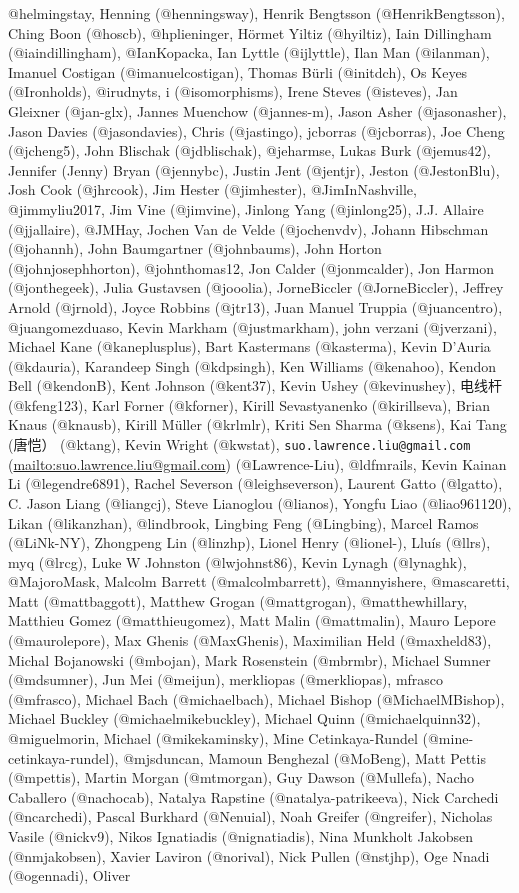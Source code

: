 \documentclass[
]{book}
\renewcommand{\href}[2]{#2 (\url{#1})}
\begin{document}
@helmingstay, Henning (@henningsway), Henrik Bengtsson (@HenrikBengtsson), Ching Boon (@hoscb), @hplieninger, Hörmet Yiltiz (@hyiltiz), Iain Dillingham (@iaindillingham), @IanKopacka, Ian Lyttle (@ijlyttle), Ilan Man (@ilanman), Imanuel Costigan (@imanuelcostigan), Thomas Bürli (@initdch), Os Keyes (@Ironholds), @irudnyts, i (@isomorphisms), Irene Steves (@isteves), Jan Gleixner (@jan-glx), Jannes Muenchow (@jannes-m), Jason Asher (@jasonasher), Jason Davies (@jasondavies), Chris (@jastingo), jcborras (@jcborras), Joe Cheng (@jcheng5), John Blischak (@jdblischak), @jeharmse, Lukas Burk (@jemus42), Jennifer (Jenny) Bryan (@jennybc), Justin Jent (@jentjr), Jeston (@JestonBlu), Josh Cook (@jhrcook), Jim Hester (@jimhester), @JimInNashville, @jimmyliu2017, Jim Vine (@jimvine), Jinlong Yang (@jinlong25), J.J. Allaire (@jjallaire), @JMHay, Jochen Van de Velde (@jochenvdv), Johann Hibschman (@johannh), John Baumgartner (@johnbaums), John Horton (@johnjosephhorton), @johnthomas12, Jon Calder (@jonmcalder), Jon Harmon (@jonthegeek), Julia Gustavsen (@jooolia), JorneBiccler (@JorneBiccler), Jeffrey Arnold (@jrnold), Joyce Robbins (@jtr13), Juan Manuel Truppia (@juancentro), @juangomezduaso, Kevin Markham (@justmarkham), john verzani (@jverzani), Michael Kane (@kaneplusplus), Bart Kastermans (@kasterma), Kevin D'Auria (@kdauria), Karandeep Singh (@kdpsingh), Ken Williams (@kenahoo), Kendon Bell (@kendonB), Kent Johnson (@kent37), Kevin Ushey (@kevinushey), 电线杆 (@kfeng123), Karl Forner (@kforner), Kirill Sevastyanenko (@kirillseva), Brian Knaus (@knausb), Kirill Müller (@krlmlr), Kriti Sen Sharma (@ksens), Kai Tang (唐恺） (@ktang), Kevin Wright (@kwstat), \href{mailto:suo.lawrence.liu@gmail.com}{\nolinkurl{suo.lawrence.liu@gmail.com}} (@Lawrence-Liu), @ldfmrails, Kevin Kainan Li (@legendre6891), Rachel Severson (@leighseverson), Laurent Gatto (@lgatto), C. Jason Liang (@liangcj), Steve Lianoglou (@lianos), Yongfu Liao (@liao961120), Likan (@likanzhan), @lindbrook, Lingbing Feng (@Lingbing), Marcel Ramos (@LiNk-NY), Zhongpeng Lin (@linzhp), Lionel Henry (@lionel-), Lluís (@llrs), myq (@lrcg), Luke W Johnston (@lwjohnst86), Kevin Lynagh (@lynaghk), @MajoroMask, Malcolm Barrett (@malcolmbarrett), @mannyishere, @mascaretti, Matt (@mattbaggott), Matthew Grogan (@mattgrogan), @matthewhillary, Matthieu Gomez (@matthieugomez), Matt Malin (@mattmalin), Mauro Lepore (@maurolepore), Max Ghenis (@MaxGhenis), Maximilian Held (@maxheld83), Michal Bojanowski (@mbojan), Mark Rosenstein (@mbrmbr), Michael Sumner (@mdsumner), Jun Mei (@meijun), merkliopas (@merkliopas), mfrasco (@mfrasco), Michael Bach (@michaelbach), Michael Bishop (@MichaelMBishop), Michael Buckley (@michaelmikebuckley), Michael Quinn (@michaelquinn32), @miguelmorin, Michael (@mikekaminsky), Mine Cetinkaya-Rundel (@mine-cetinkaya-rundel), @mjsduncan, Mamoun Benghezal (@MoBeng), Matt Pettis (@mpettis), Martin Morgan (@mtmorgan), Guy Dawson (@Mullefa), Nacho Caballero (@nachocab), Natalya Rapstine (@natalya-patrikeeva), Nick Carchedi (@ncarchedi), Pascal Burkhard (@Nenuial), Noah Greifer (@ngreifer), Nicholas Vasile (@nickv9), Nikos Ignatiadis (@nignatiadis), Nina Munkholt Jakobsen (@nmjakobsen), Xavier Laviron (@norival), Nick Pullen (@nstjhp), Oge Nnadi (@ogennadi), Oliver 
\end{document}
